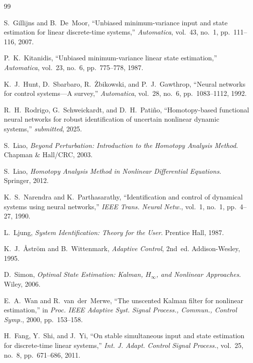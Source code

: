 \documentclass[lettersize,journal]{IEEEtran}
\begin{document}
\begin{thebibliography}{99}

S.~Gillijns and B.~De~Moor, ``Unbiased minimum-variance input and state estimation for linear discrete-time systems,'' \textit{Automatica}, vol.~43, no.~1, pp.~111--116, 2007.

P.~K.~Kitanidis, ``Unbiased minimum-variance linear state estimation,'' \textit{Automatica}, vol.~23, no.~6, pp.~775--778, 1987.

K.~J.~Hunt, D.~Sbarbaro, R.~\.Zbikowski, and P.~J.~Gawthrop, ``Neural networks for control systems---A survey,'' \textit{Automatica}, vol.~28, no.~6, pp.~1083--1112, 1992.

R.~H.~Rodrigo, G.~Schweickardt, and D.~H.~Pati\~no, ``Homotopy-based functional neural networks for robust identification of uncertain nonlinear dynamic systems,'' \textit{submitted}, 2025.

S.~Liao, \textit{Beyond Perturbation: Introduction to the Homotopy Analysis Method}. Chapman \& Hall/CRC, 2003.

S.~Liao, \textit{Homotopy Analysis Method in Nonlinear Differential Equations}. Springer, 2012.

K.~S.~Narendra and K.~Parthasarathy, ``Identification and control of dynamical systems using neural networks,'' \textit{IEEE Trans. Neural Netw.}, vol.~1, no.~1, pp.~4--27, 1990.

L.~Ljung, \textit{System Identification: Theory for the User}. Prentice Hall, 1987.

K.~J.~\AA{}str\"om and B.~Wittenmark, \textit{Adaptive Control}, 2nd~ed. Addison-Wesley, 1995.

D.~Simon, \textit{Optimal State Estimation: Kalman, $H_\infty$, and Nonlinear Approaches}. Wiley, 2006.

E.~A.~Wan and R.~van~der~Merwe, ``The unscented Kalman filter for nonlinear estimation,'' in \textit{Proc. IEEE Adaptive Syst. Signal Process., Commun., Control Symp.}, 2000, pp.~153--158.

H.~Fang, Y.~Shi, and J.~Yi, ``On stable simultaneous input and state estimation for discrete-time linear systems,'' \textit{Int. J. Adapt. Control Signal Process.}, vol.~25, no.~8, pp.~671--686, 2011.


\end{thebibliography}
\end{document}
